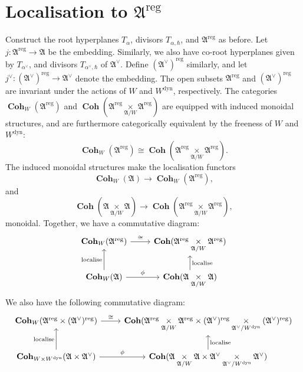 \documentclass[a4paper]{report}
\theoremstyle{theorem}
\theoremstyle{definition}
\theoremstyle{remark}
\theoremstyle{proposition}
\theoremstyle{conjecture}
\theoremstyle{lemma}
\theoremstyle{corollary}
\theoremstyle{exercise}
\theoremstyle{example}
\newcommand{\on}{\operatorname}
\newcommand{\coh}{\on{\mathbf{Coh}}}
\newcommand{\dyn}{{\on{dyn}}}
\begin{document}
  \section{Localisation to $\mathfrak{A}^{\on{reg}}$}
  
  Construct the root hyperplanes $T_\alpha$, divisors $T_{\alpha,\hbar}$,
  and $\mathfrak{A}^{\on{reg}}$ as before. Let $j : \mathfrak{A}^{\on{reg}} \to\mathfrak{A}$ be the embedding. Similarly, we also have co-root hyperplanes
  given by $T_{\alpha^\vee}$, and divisors $T_{\alpha^\vee,\hbar}$ of 
  $\mathfrak{A}^\vee$. Define $(\mathfrak{A}^\vee)^{\on{reg}}$ similarly,
  and let $j^\vee  : (\mathfrak{A}^\vee)^{\on{reg}} \to \mathfrak{A}^\vee$
  denote the embedding. The open subsets $\mathfrak{A}^{\on{reg}}$ and 
  $(\mathfrak{A}^\vee)^{\on{reg}}$ are invariant under the actions of 
  $W$ and $W^\dyn$, respectively. The categories $\coh_W(\mathfrak{A}^{\on{reg}})$
  and $\coh(\mathfrak{A}^{\on{reg}} \underset{\mathfrak{A}/W}{\times} \mathfrak{A}^{\on{reg}})$ are equipped with induced monoidal structures, and are furthermore 
  categorically equivalent by the freeness of $W$ and $W^\dyn$:
  $$\coh_W(\mathfrak{A}^{\on{reg}}) \cong \coh(\mathfrak{A}^{\on{reg}} \underset{\mathfrak{A}/W}{\times} \mathfrak{A}^{\on{reg}}).$$
  The induced monoidal structures make the localisation functors 
  $$\coh_W(\mathfrak{A}) \longrightarrow \coh_W(\mathfrak{A}^{\on{reg}}),$$
  and
  $$\coh(\mathfrak{A} \underset{\mathfrak{A}/W}{\times} \mathfrak{A}) \longrightarrow \coh(\mathfrak{A}^{\on{reg}} \underset{\mathfrak{A}/W}{\times} \mathfrak{A}^{\on{reg}}),$$
  monoidal. Together, we have a commutative diagram:
  $$\begin{tikzcd}
  \coh_W(\mathfrak{A}^{\on{reg}}) \arrow[r, "\cong"]                & \coh(\mathfrak{A}^{\on{reg}} \underset{\mathfrak{A}/W}{\times} \mathfrak{A}^{\on{reg}})       \\
  \coh_W(\mathfrak{A}) \arrow[u, "\on{localise}"] \arrow[r, "\phi"] & \coh(\mathfrak{A} \underset{\mathfrak{A}/W}{\times} \mathfrak{A}) \arrow[u, "\on{localise}"']
  \end{tikzcd}$$
  We also have the following commutative diagram:
  $$\begin{tikzcd}
  \coh_W(\mathfrak{A}^{\on{reg}} \times (\mathfrak{A}^\vee)^{\on{reg}}) \arrow[r, "\cong"]                   & \coh(\mathfrak{A}^{\on{reg}} \underset{\mathfrak{A}/W}{\times} \mathfrak{A}^{\on{reg}} \times (\mathfrak{A}^\vee)^{\on{reg}} \underset{\mathfrak{A}^\vee/W^\dyn}{\times} (\mathfrak{A}^\vee)^{\on{reg}}) \\
  \coh_{W \times W^\dyn}(\mathfrak{A} \times \mathfrak{A}^\vee) \arrow[u, "\on{localise}"] \arrow[r, "\phi"] & \coh(\mathfrak{A} \underset{\mathfrak{A}/W}{\times} \mathfrak{A} \times \mathfrak{A}^\vee \underset{\mathfrak{A}^\vee/W^\dyn}{\times} \mathfrak{A}^\vee) \arrow[u, "\on{localise}"']                    
  \end{tikzcd}$$
\end{document}
